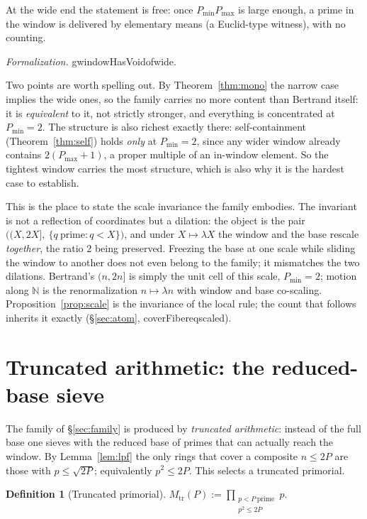 \documentclass[11pt,a4paper]{amsart}
\theoremstyle{plain}
\theoremstyle{definition}
\newtheorem{definition}[theorem]{Definition}
\theoremstyle{plain}
\theoremstyle{remark}
\newcommand{\lean}[1]{\begingroup\upshape\ttfamily\def\_{\textunderscore\allowbreak}#1\endgroup}
\newcommand{\Formal}[1]{\par\smallskip\noindent\begingroup\raggedright\emph{Formalization.} #1\par\endgroup\smallskip}
\begin{document}
At the wide end the statement is free: once $P_{\min}P_{\max}$ is large enough, a prime in
the window is delivered by elementary means (a Euclid-type witness), with no counting.

\Formal{\lean{gwindowHasVoid\_of\_wide}.}

Two points are worth spelling out. By Theorem~\ref{thm:mono} the narrow case implies the
wide ones, so the family carries no more content than Bertrand itself: it is
\emph{equivalent} to it, not strictly stronger, and everything is concentrated at
$P_{\min}=2$. The structure is also richest exactly there: self-containment
(Theorem~\ref{thm:self}) holds \emph{only} at $P_{\min}=2$, since any wider window already
contains $2(P_{\max}+1)$, a proper multiple of an in-window element. So the tightest
window carries the most structure, which is also why it is the hardest case to establish.

This is the place to state the scale invariance the family embodies. The invariant is not
a reflection of coordinates but a dilation: the object is the pair
$\big((X,2X],\ \{q\ \text{prime}:q<X\}\big)$, and under $X\mapsto\lambda X$ the window and
the base rescale \emph{together}, the ratio $2$ being preserved. Freezing the base at one
scale while sliding the window to another does not even belong to the family; it mismatches
the two dilations. Bertrand's $(n,2n]$ is simply the unit cell of this scale,
$P_{\min}=2$; motion along $\mathbb{N}$ is the renormalization $n\mapsto\lambda n$ with
window and base co-scaling. Proposition~\ref{prop:scale} is the invariance of the local
rule; the count that follows inherits it exactly (\S\ref{sec:atom},
\lean{coverFiber\_eq\_scaled}).

\section{Truncated arithmetic: the reduced-base sieve}
\label{sec:trunc}

The family of \S\ref{sec:family} is produced by \emph{truncated arithmetic}: instead of
the full base one sieves with the reduced base of primes that can actually reach the
window. By Lemma~\ref{lem:lpf} the only rings that cover a composite $n\le 2P$ are those
with $p\le\sqrt{2P}$; equivalently $p^2\le 2P$. This selects a truncated primorial.

\begin{definition}[Truncated primorial]
$\displaystyle M_{\mathrm{tr}}(P):=\prod_{\substack{p<P\ \text{prime}\\ p^2\le 2P}}p.$
\end{definition}
\end{document}
